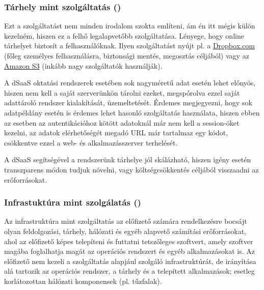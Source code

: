 \subsubsection{Tárhely mint szolgáltatás ()}
Ezt a szolgáltatást nem minden irodalom szokta említeni, ám én itt mégis külön kezelném, hiszen ez a felhő legalapvetőbb szolgáltatása. Lényege, hogy online tárhelyet biztosít a felhasználóknak. Ilyen szolgáltatást nyújt pl. a \href{http://www.dropbox.com}{Dropbox.com} (főleg személyes felhasználásra, biztonsági mentés, megosztás céljából) vagy az \href{https://aws.amazon.com/s3/}{Amazon S3} (inkább nagy szolgáltatók használják).

A dSaaS oktatási rendszerek esetében sok nagyméretű adat esetén lehet előnyös, hiszen nem kell a saját szerverünkön tárolni ezeket, megspórolva ezzel saját adattároló rendszer kialakítását, üzemeltetését. Érdemes megjegyezni, hogy sok adatpéldány esetén is érdemes lehet hasonló szolgáltatás használata, hiszen ebben az esetben az autentikációhoz kötött adatoknál már nem kell a session-öket kezelni, az adatok elérhetőségét megadó URL már tartalmaz egy kódot, csökkentve ezzel a web- és alkalmazásszerver terhelését. 

A dSaaS segítségével a rendszerünk tárhelye jól skálázható, hiszen igény esetén transzparens módon tudjuk növelni, vagy költségcsökkentés céljából visszaadni az erőforrásokat. 

\subsubsection{Infrastuktúra mint szolgálatás ()}

Az infrastruktúra mint szolgáltatás az előfizető számára rendelkezésre bocsájt olyan feldolgozási, tárhely, hálózati és egyéb alapvető számítási erőforrásokat, ahol az előfizető képes telepíteni és futtatni tetszőleges szoftvert, amely szoftver magába foglalhatja magát az operációs rendszert és egyéb alkalmazásokat is. Az előfizető nem kezeli a szolgáltatás alapjául szolgáló infrastruktúrát, de irányítása alá tartozik az operációs rendszer, a tárhely és a telepített alkalmazások; esetleg korlátozottan hálózati komponensek (pl. tűzfalak)\cite{nistsp800-145}.

